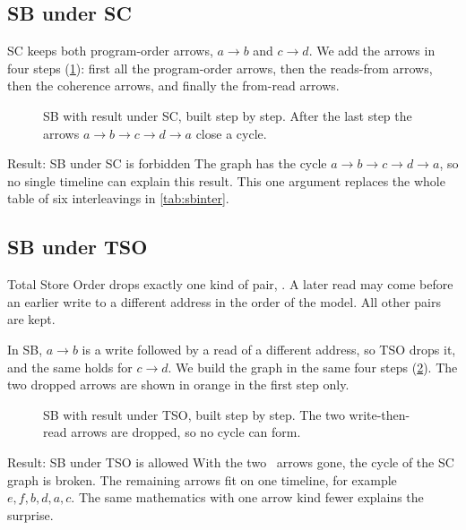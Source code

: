 \subsection{SB under SC}
\label{sec:sbsc}

SC keeps both program-order arrows, $a \to b$ and $c \to d$. We add the arrows in four steps (\cref{fig:sbsc}): first all the program-order arrows, then the reads-from arrows, then the coherence arrows, and finally the from-read arrows.

\begin{figure}[H]
\centering
{}
\caption{SB with result  under SC, built step by step. After the last step the arrows $a \to b \to c \to d \to a$ close a cycle.}
\label{fig:sbsc}
\end{figure}

\begin{forbidbox}{Result: SB  under SC is forbidden}
The graph has the cycle $a \to b \to c \to d \to a$, so no single timeline can explain this result. This one argument replaces the whole table of six interleavings in \cref{tab:sbinter}.
\end{forbidbox}

\subsection{SB under TSO}
\label{sec:tso}
\label{sec:sbtso}

Total Store Order drops exactly one kind of pair, \WR. A later read may come before an earlier write to a different address in the order of the model. All other pairs are kept.

In SB, $a \to b$ is a write followed by a read of a different address, so TSO drops it, and the same holds for $c \to d$. We build the graph in the same four steps (\cref{fig:sbtso}). The two dropped arrows are shown in orange in the first step only.

\begin{figure}[H]
\centering
{}
\caption{SB with result  under TSO, built step by step. The two write-then-read arrows are dropped, so no cycle can form.}
\label{fig:sbtso}
\end{figure}

\begin{resultbox}{Result: SB  under TSO is allowed}
With the two \WR\ arrows gone, the cycle of the SC graph is broken. The remaining arrows fit on one timeline, for example $e, f, b, d, a, c$. The same mathematics with one arrow kind fewer explains the surprise.
\end{resultbox}

